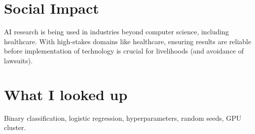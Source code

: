 \documentclass[12pt, letterpaper]{article}
\begin{document}
\section{Social Impact}
\label{sec:impact}
AI research is being used in industries beyond computer science, including healthcare. With high-stakes domains like healthcare, ensuring results are reliable before implementation of technology is crucial for livelihoods (and avoidance of lawsuits).

\section{What I looked up}
\label{sec:looked up}
Binary classification, logistic regression, hyperparameters, random seeds, GPU cluster.


\end{document}
